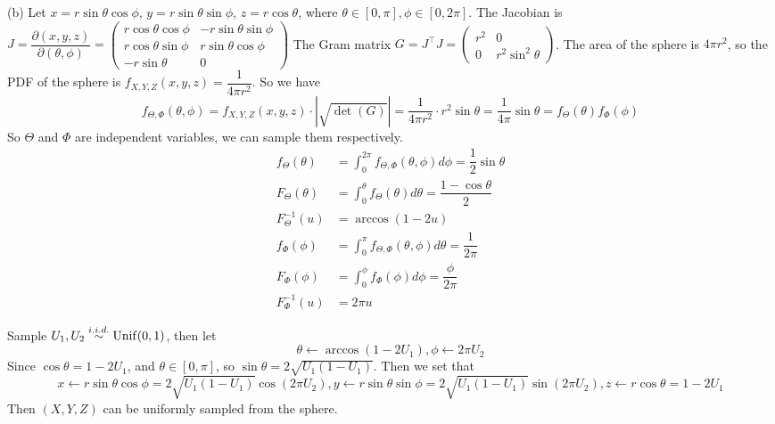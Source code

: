 \begin{homeworkProblem}
(b) Let $x=r\sin\theta\cos\phi$, $y=r\sin\theta\sin\phi$, $z=r\cos\theta$, where $\theta\in [0, \pi], \phi\in [0, 2\pi]$. The Jacobian is $J=\dfrac{\partial(x, y, z)}{\partial(\theta, \phi)}=\begin{pmatrix}
r\cos\theta\cos\phi & -r\sin\theta\sin\phi \\
r\cos\theta\sin\phi & r\sin\theta\cos\phi \\
-r\sin\theta & 0
\end{pmatrix}$
The Gram matrix $G=J^{\top}J=\begin{pmatrix}
r^2 & 0 \\
0 & r^2\sin^2\theta
\end{pmatrix}$.
The area of the sphere is $4\pi r^2$, so the PDF of the sphere is $f_{X, Y, Z}(x, y, z)=\dfrac{1}{4\pi r^2}$.
So we have
$$f_{\Theta, \Phi}(\theta, \phi) = f_{X, Y, Z}(x, y, z)\cdot|\sqrt{\det(G)}|=\dfrac{1}{4\pi r^2}\cdot r^2\sin\theta = \dfrac{1}{4\pi}\sin\theta=f_{\Theta}(\theta)f_{\Phi}(\phi)$$
So $\Theta$ and $\Phi$ are independent variables, we can sample them respectively.
\begin{align*}
f_{\Theta}(\theta) &= \int_{0}^{2\pi}f_{\Theta, \Phi}(\theta, \phi)d\phi = \dfrac{1}{2}\sin\theta \\
F_{\Theta}(\theta) &= \int_{0}^{\theta}f_{\Theta}(\theta)d\theta = \dfrac{1-\cos\theta}{2} \\
F^{-1}_{\Theta}(u) &= \arccos(1-2u) \\
f_{\Phi}(\phi) &= \int_{0}^{\pi}f_{\Theta, \Phi}(\theta, \phi)d\theta = \dfrac{1}{2\pi} \\
F_{\Phi}(\phi) &= \int_{0}^{\phi}f_{\Phi}(\phi)d\phi = \dfrac{\phi}{2\pi} \\
F^{-1}_{\Phi}(u) &= 2\pi u
\end{align*}

Sample $U_1, U_2\stackrel{i.i.d.}{\sim} \operatorname{Unif}(0, 1)$, then let
$$\theta\leftarrow \arccos(1-2U_1), \phi\leftarrow 2\pi U_2$$
Since $\cos\theta = 1 - 2U_1$, and $\theta\in [0, \pi]$, so $\sin\theta = 2\sqrt{U_1(1-U_1)}$. Then we set that
$$x\gets r\sin\theta\cos\phi = 2\sqrt{U_1(1-U_1)}\cos(2\pi U_2), y\gets r\sin\theta\sin\phi = 2\sqrt{U_1(1-U_1)}\sin(2\pi U_2), z\gets r\cos\theta = 1-2U_1$$
Then $(X, Y, Z)$ can be uniformly sampled from the sphere.


\end{homeworkProblem}
